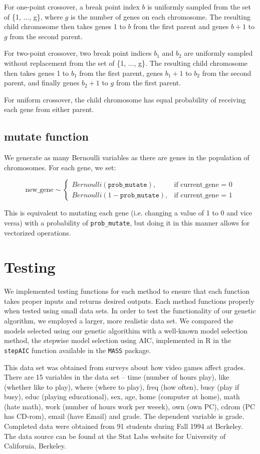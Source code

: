 \documentclass[11pt]{article}
\begin{document}
For one-point crossover, a break point index $b$ is uniformly sampled from the set of \{1, ..., g\}, where $g$ is the number of genes on each chromosome. The resulting child chromosome then takes genes 1 to $b$ from the first parent and genes $b+1$ to $g$ from the second parent.

For two-point crossover, two break point indices $b_1$ and $b_2$ are uniformly sampled without replacement from the set of \{1, ..., g\}. The resulting child chromosome then takes genes 1 to $b_1$ from the first parent, genes $b_1+1$ to $b_2$ from the second parent, and finally genes $b_2+1$ to $g$ from the first parent.

For uniform crossover, the child chromosome has equal probability of receiving each gene from either parent.

\subsection*{mutate function}
We generate as many Bernoulli variables as there are genes in the population of chromosomes. For each gene, we set:

\[
\text{new\_gene} \sim
\begin{cases}
Bernoulli(\texttt{prob\_mutate}), & \text{if current\_gene = 0}\\
Bernoulli(1-\texttt{prob\_mutate}), & \text{if current\_gene = 1}
\end{cases}
\]

This is equivalent to mutating each gene (i.e. changing a value of 1 to 0 and vice versa) with a probability of \texttt{prob\_mutate}, but doing it in this manner allows for vectorized operations.

\section{Testing} 
We implemented testing functions for each method to ensure that each 
function takes proper inputs and returns desired outputs. Each method 
functions properly when tested using small data sets. In order to test the 
functionality of our genetic algorithm, we employed a larger, more realistic 
data set. We compared the models selected using our genetic algorithim with a 
well-known model selection method, the stepwise model selection using AIC, 
implemented in R in the \texttt{stepAIC} function available in the 
\texttt{MASS} package.

This data set was obtained from surveys about how video games 
affect grades. There are 15 variables in the data set -- time (number of 
hours play), like (whether like to play), where (where to play), freq (how 
often), busy (play if busy), educ (playing educational), sex, age, home 
(computer at home), math (hate math), work (number of hours work per weeek), 
own (own PC), cdrom (PC has CD-rom), email (have Email) and grade. The 
dependent variable is grade. Completed data were obtained from 91 students 
during Fall 1994 at Berkeley. The data source can be found at the Stat Labs 
website for University of California, Berkeley. 
\end{document}
